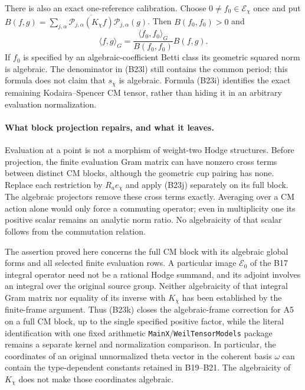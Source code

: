 There is also an exact one-reference calibration.
Choose $0\ne f_0\in\mathcal E_\chi$ once and put
$B(f,g)=\sum_{j,\alpha}
\overline{\mathcal P_{j,\alpha}(K_\chi f)}
\mathcal P_{j,\alpha}(g)$.  Then $B(f_0,f_0)>0$ and
\[
 \langle f,g\rangle_G
       =\frac{\langle f_0,f_0\rangle_G}{B(f_0,f_0)}
                           B(f,g).
 \tag{B23l}
\]
If $f_0$ is specified by an algebraic-coefficient Betti
class its geometric squared norm is algebraic.  The
denominator in (B23l) still contains the common period;
this formula does not claim that $s_\chi$ is algebraic.
Formula (B23i) identifies the exact remaining
Kodaira--Spencer CM tensor, rather than hiding it in
an arbitrary evaluation normalization.

\paragraph{What block projection repairs, and what it leaves.}
Evaluation at a point is not a morphism of weight-two
Hodge structures.  Before projection, the finite
evaluation Gram matrix can have nonzero cross terms
between distinct CM blocks, although the geometric
cup pairing has none.  Replace each restriction by
$R_ae_\chi$ and apply (B23j) separately on its full
block.  The algebraic projectors remove these cross
terms exactly.  Averaging over a CM action alone
would only force a commuting operator; even in
multiplicity one its positive scalar remains an
analytic norm ratio.  No algebraicity of that scalar
follows from the commutation relation.

The assertion proved here concerns the full CM block
with its algebraic global forms and all selected
finite evaluation rows.  A particular image
$\mathcal E_0$ of the B17 integral operator need not
be a rational Hodge summand, and its adjoint involves
an integral over the original source group.  Neither
algebraicity of that integral Gram matrix nor equality
of its inverse with $K_\chi$ has been established by
the finite-frame argument.  Thus (B23k) closes the
algebraic-frame correction for A5 on a full CM block,
up to the single specified positive factor, while
the literal identification with one fixed arithmetic
\texttt{MainX}/\texttt{WeilTensorModels} package remains
a separate kernel and normalization comparison.
In particular, the coordinates of an original unnormalized
theta vector in the coherent basis $\omega$ can contain
the type-dependent constants retained in B19--B21.
The algebraicity of $K_\chi$ does not make those
coordinates algebraic.

